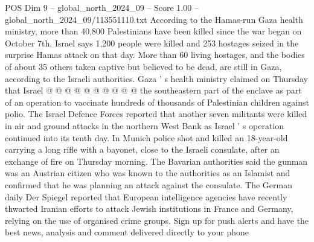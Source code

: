 \begin{textsample}{POS Dim 9 – global\_north\_2024\_09 – Score 1.00 – global\_north\_2024\_09/113551110.txt}
According to the Hamas-run Gaza health ministry, more than 40,800 Palestinians have been killed since the war began on October 7th.
Israel says 1,200 people were killed and 253 hostages seized in the surprise Hamas attack on that day.
More than 60 living hostages, and the bodies of about 35 others taken captive but believed to be dead, are still in Gaza, according to the Israeli authorities.
Gaza ' s health ministry claimed on Thursday that Israel @ @ @ @ @ @ @ @ @ @ the southeastern part of the enclave as part of an operation to vaccinate hundreds of thousands of Palestinian children against polio.
The Israel Defence Forces reported that another seven militants were killed in air and ground attacks in the northern West Bank as Israel ' s operation continued into its tenth day.
In Munich police shot and killed an 18-year-old carrying a long rifle with a bayonet, close to the Israeli consulate, after an exchange of fire on Thursday morning.
The Bavarian authorities said the gunman was an Austrian citizen who was known to the authorities as an Islamist and confirmed that he was planning an attack against the consulate.
The German daily Der Spiegel reported that European intelligence agencies have recently thwarted Iranian efforts to attack Jewish institutions in France and Germany, relying on the use of organised crime groups.
Sign up for push alerts and have the best news, analysis and comment delivered directly to your phone

\end{textsample}
